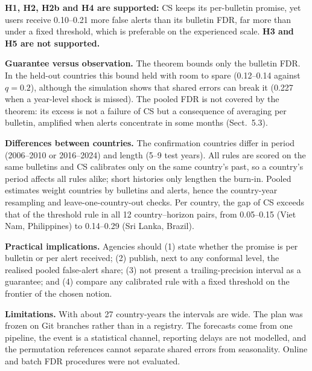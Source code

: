 \documentclass[runningheads]{llncs}
\makeatletter
\renewcommand\section{\@startsection{section}{1}{\z@}{-12\p@ \@plus -2\p@ \@minus -2\p@}{6\p@ \@plus 2\p@ \@minus 1\p@}{\normalfont\large\bfseries\boldmath\rightskip=\z@ \@plus 8em\pretolerance=10000 }}
\makeatother
\begin{document}
\section{Discussion}

\textbf{H1, H2, H2b and H4 are supported:} CS keeps its per-bulletin promise, yet users receive 0.10--0.21 more false alerts than its bulletin FDR, far more than under a fixed threshold, which is preferable on the experienced scale. \textbf{H3 and H5 are not supported.}

\textbf{Guarantee versus observation.} The theorem bounds only the bulletin FDR. In the held-out countries this bound held with room to spare (0.12--0.14 against $q=0.2$), although the simulation shows that shared errors can break it (0.227 when a year-level shock is missed). The pooled FDR is not covered by the theorem: its excess is not a failure of CS but a consequence of averaging per bulletin, amplified when alerts concentrate in some months (Sect.~5.3).

\textbf{Differences between countries.} The confirmation countries differ in period (2006--2010 or 2016--2024) and length (5--9 test years). All rules are scored on the same bulletins and CS calibrates only on the same country's past, so a country's period affects all rules alike; short histories only lengthen the burn-in. Pooled estimates weight countries by bulletins and alerts, hence the country-year resampling and leave-one-country-out checks. Per country, the gap of CS exceeds that of the threshold rule in all 12 country--horizon pairs, from 0.05--0.15 (Viet Nam, Philippines) to 0.14--0.29 (Sri Lanka, Brazil).

\textbf{Practical implications.} Agencies should (1) state whether the promise is per bulletin or per alert received; (2) publish, next to any conformal level, the realised pooled false-alert share; (3) not present a trailing-precision interval as a guarantee; and (4) compare any calibrated rule with a fixed threshold on the frontier of the chosen notion.

\textbf{Limitations.} With about 27 country-years the intervals are wide. The plan was frozen on Git branches rather than in a registry. The forecasts come from one pipeline, the event is a statistical channel, reporting delays are not modelled, and the permutation references cannot separate shared errors from seasonality. Online and batch FDR procedures \cite{javanmard2018,zrnic2020} were not evaluated.
\end{document}
